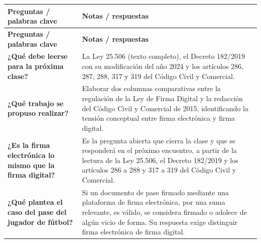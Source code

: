 \documentclass[12pt,oneside]{book}
\newlength{\cornellizq}
\newlength{\cornellder}
\begin{document}
\begin{longtable}{
    >{\raggedright\arraybackslash}p{\cornellizq}
    >{\raggedright\arraybackslash}p{\cornellder}
}
\toprule
\textbf{Preguntas / palabras clave} & \textbf{Notas / respuestas} \\
\midrule
\endfirsthead
\toprule
\textbf{Preguntas / palabras clave} & \textbf{Notas / respuestas} \\
\midrule
\endhead

\textbf{¿Qué debe leerse para la próxima clase?} &
La Ley 25.506 (texto completo), el Decreto 182/2019 con su modificación del año 2024 y los artículos 286, 287, 288, 317 y 319 del Código Civil y Comercial. \\
\addlinespace[0.6em]
\midrule[\lightrulewidth]

\textbf{¿Qué trabajo se propuso realizar?} &
Elaborar dos columnas comparativas entre la regulación de la Ley de Firma Digital y la redacción del Código Civil y Comercial de 2015, identificando la tensión conceptual entre firma electrónica y firma digital. \\
\addlinespace[0.6em]
\midrule[\lightrulewidth]

\textbf{¿Es la firma electrónica lo mismo que la firma digital?} &
Es la pregunta abierta que cierra la clase y que se responderá en el próximo encuentro, a partir de la lectura de la Ley 25.506, el Decreto 182/2019 y los artículos 286 a 288 y 317 a 319 del Código Civil y Comercial. \\
\addlinespace[0.6em]
\midrule[\lightrulewidth]

\textbf{¿Qué plantea el caso del pase del jugador de fútbol?} &
Si un documento de pase firmado mediante una plataforma de firma electrónica, por una suma relevante, es válido, se considera firmado o adolece de algún vicio de forma. Su respuesta exige distinguir firma electrónica de firma digital. \\

\midrule


\end{longtable}
\end{document}
